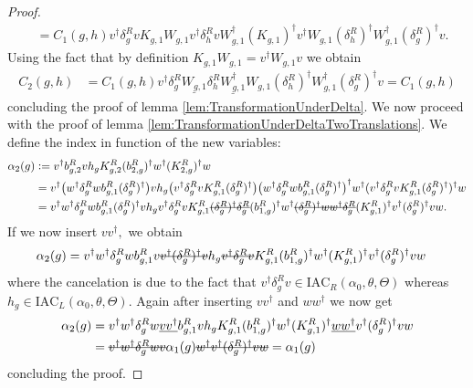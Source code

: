 \documentclass[11pt,a4paper,twoside]{article}
\numberwithin{equation}{section}
\begin{document}
\begin{proof}
\begin{align}
			\nonumber
			&=C_1(g,h)v^\dagger \delta_g^R v K_{g,1} W_{g,1}v^\dagger \delta_h^R v W_{g,1}^\dagger (K_{g,1})^\dagger v^\dagger W_{g,1}(\delta^R_h)^\dagger W_{g,1}^\dagger(\delta_g^R)^\dagger v.
		\end{align}
		Using the fact that by definition $K_{g,1}W_{g,1}=v^\dagger W_{g,1}v$ we obtain
		\begin{align}
			C_2(g,h)&=C_1(g,h)v^\dagger \delta_g^R \underline{W_{g,1}} \delta_h^R \underline{W_{g,1}^\dagger} W_{g,1}(\delta^R_h)^\dagger W_{g,1}^\dagger(\delta_g^R)^\dagger v=C_1(g,h)
		\end{align}
		concluding the proof of lemma \ref{lem:TransformationUnderDelta}. We now proceed with the proof of lemma \ref{lem:TransformationUnderDeltaTwoTranslations}. We define the index in function of the new variables:
		\begin{align}
			\nonumber
			\alpha_2(g)&\defeq v^\dagger b^R_{g,2}v h_g K^R_{g,2}(b^R_{2,g})^\dagger w^\dagger (K^R_{2,g})^\dagger w\\
			&=v^\dagger \left(w^\dagger\delta^R_g w b_{g,1}^R (\delta^R_g)^\dagger\right) v h_g \left(v^\dagger \delta_g^R v K_{g,1}^R (\delta_g^R)^\dagger\right) \left(w^\dagger\delta^R_g w b_{g,1}^R (\delta^R_g)^\dagger\right)^\dagger w^\dagger (v^\dagger \delta_g^R v K_{g,1}^R (\delta_g^R)^\dagger)^\dagger w\\
			\nonumber
			&=v^\dagger w^\dagger\delta^R_g w b_{g,1}^R (\delta^R_g)^\dagger v h_g v^\dagger \delta_g^R v K_{g,1}^R \stkout{(\delta_g^R)^\dagger \delta_g^R} (b_{1,g}^R)^\dagger w^\dagger \stkout{(\delta_g^R)^\dagger w w^\dagger \delta_g^R} (K_{g,1}^R)^\dagger v^\dagger (\delta_g^R)^\dagger v  w.
		\end{align}
		If we now insert $vv^\dagger,$ we obtain
		\begin{align}
			\alpha_2(g)&=v^\dagger w^\dagger\delta^R_g w b_{g,1}^R v\stkout{v^\dagger (\delta^R_g)^\dagger v} h_g \stkout{v^\dagger \delta_g^R v} K_{g,1}^R (b_{1,g}^R)^\dagger w^\dagger (K_{g,1}^R)^\dagger v^\dagger (\delta_g^R)^\dagger v  w
		\end{align}
		where the cancelation is due to the fact that $v^\dagger \delta^R_g v\in\textrm{IAC}_{R}(\alpha_0,\theta,\Theta)$ whereas $h_g\in \textrm{IAC}_{L}(\alpha_0,\theta,\Theta)$. Again after inserting $vv^\dagger$ and $ww^\dagger$ we now get
		\begin{align}
			\alpha_2(g)&=v^\dagger w^\dagger\delta^R_g w \underline{v v^\dagger} b_{g,1}^R v h_g K_{g,1}^R (b_{1,g}^R)^\dagger w^\dagger (K_{g,1}^R)^\dagger \underline{ww^\dagger} v^\dagger (\delta_g^R)^\dagger v  w\\
			\nonumber
			&=\stkout{v^\dagger w^\dagger\delta^R_g w v} \alpha_1(g) \stkout{w^\dagger v^\dagger (\delta_g^R)^\dagger v  w}=\alpha_1(g)
		\end{align}
		concluding the proof.
	\end{proof}
\end{document}
